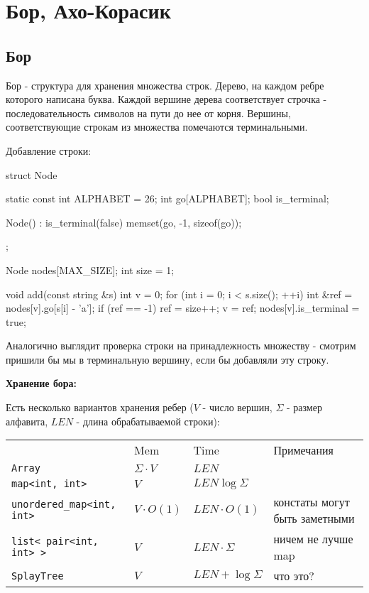 
\section{Бор, Ахо-Корасик}

\subsection{Бор}
\begin{Def}
Бор - структура для хранения множества строк. Дерево, на каждом ребре которого написана буква. Каждой вершине дерева соответствует строчка - последовательность символов на пути до нее от корня. Вершины, соответствующие строкам из множества помечаются терминальными. 
\end{Def}


Добавление строки:

\begin{cppcode}
struct Node {
    static const int ALPHABET = 26;
    int go[ALPHABET];
    bool is_terminal;
    
    Node() : is_terminal(false) {
        memset(go, -1, sizeof(go));
    }
};

Node nodes[MAX_SIZE];
int size = 1;

void add(const string &s) {
    int v = 0;
    for (int i = 0; i < s.size(); ++i) {
        int &ref = nodes[v].go[s[i] - 'a'];
        if (ref == -1)
            ref = size++;
        v = ref; 	
    }
    nodes[v].is_terminal = true;
}
\end{cppcode}

Аналогично выглядит проверка строки на принадлежность множеству - смотрим пришили бы мы в терминальную вершину, если бы добавляли эту строку.

\textbf{Хранение бора:}

Есть несколько вариантов хранения ребер ($V$ - число вершин, $\Sigma$ - размер алфавита, $LEN$ - длина обрабатываемой строки):

\begin{tabular}[c]{llll}
& Mem & Time & Примечания \\
\texttt{Array} & $\Sigma \cdot V$ & $LEN$ &  \\
\texttt{map<int, int>} & $V$ & $LEN \log \Sigma$ & \\
\texttt{unordered\_map<int, int>} & $V \cdot O(1)$ & $LEN \cdot O(1)$ & констаты могут быть заметными \\
\texttt{list< pair<int, int> >} & $V$ & $LEN \cdot \Sigma$ & ничем не лучше map \\
\texttt{SplayTree} & $V$ & $LEN + \log \Sigma$ & что это?\\
\end{tabular}


